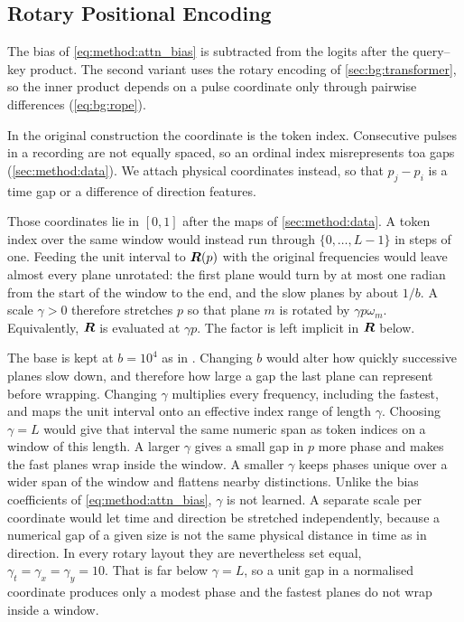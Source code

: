 \subsection{Rotary Positional Encoding}\label{sec:method:attention:rope}

The bias of \cref{eq:method:attn_bias} is subtracted from the logits after the query--key product. The second variant uses the rotary encoding of \cref{sec:bg:transformer}, so the inner product depends on a pulse coordinate only through pairwise differences (\cref{eq:bg:rope}).

In the original construction the coordinate is the token index. Consecutive pulses in a recording are not equally spaced, so an ordinal index misrepresents \gls{toa} gaps (\cref{sec:method:data}). We attach physical coordinates instead, so that $p_j-p_i$ is a time gap or a difference of direction features.

Those coordinates lie in $[0,1]$ after the maps of \cref{sec:method:data}.
A token index over the same window would instead run through $\{0,\ldots,L-1\}$ in steps of one.
Feeding the unit interval to $\bm{R}(p)$ with the original frequencies would leave almost every plane unrotated: the first plane would turn by at most one radian from the start of the window to the end, and the slow planes by about $1/b$.
A scale $\gamma>0$ therefore stretches $p$ so that plane $m$ is rotated by $\gamma p\omega_m$. Equivalently, $\bm{R}$ is evaluated at $\gamma p$. The factor is left implicit in $\bm{R}$ below.

The base is kept at $b=10^4$ as in \textcite{su2024roformer}.
Changing $b$ would alter how quickly successive planes slow down, and therefore how large a gap the last plane can represent before wrapping.
Changing $\gamma$ multiplies every frequency, including the fastest, and maps the unit interval onto an effective index range of length $\gamma$.
Choosing $\gamma=L$ would give that interval the same numeric span as token indices on a window of this length.
A larger $\gamma$ gives a small gap in $p$ more phase and makes the fast planes wrap inside the window.
A smaller $\gamma$ keeps phases unique over a wider span of the window and flattens nearby distinctions.
Unlike the bias coefficients of \cref{eq:method:attn_bias}, $\gamma$ is not learned.
A separate scale per coordinate would let time and direction be stretched independently, because a numerical gap of a given size is not the same physical distance in time as in direction.
In every rotary layout they are nevertheless set equal, $\gamma_t=\gamma_x=\gamma_y=10$.
That is far below $\gamma=L$, so a unit gap in a normalised coordinate produces only a modest phase and the fastest planes do not wrap inside a window.

